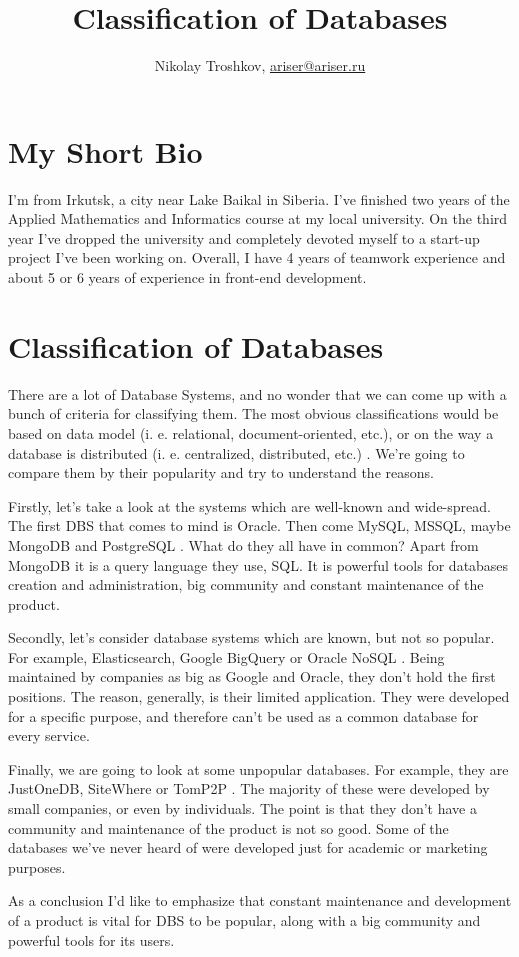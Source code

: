\documentclass{article}
\title{\vspace{-4cm}Classification of Databases}
\author{Nikolay Troshkov, \href{mailto:ariser@ariser.ru}{ariser@ariser.ru}}
\date{}
\begin{document}
\maketitle

\section*{My Short Bio}

I'm from Irkutsk, a city near Lake Baikal in Siberia. I've finished two years of the Applied Mathematics and Informatics course at my local university. On the third year I've dropped the university and completely devoted myself to a start-up project I've been working on. Overall, I have 4 years of teamwork experience and about 5 or 6 years of experience in front-end development.

\section*{Classification of Databases}

There are a lot of Database Systems, and no wonder that we can come up with a bunch of criteria for classifying them. The most obvious classifications would be based on data model (i. e. relational, document-oriented, etc.), or on the way a database is distributed (i. e. centralized, distributed, etc.) \cite{dbClassifications}. We're going to compare them by their popularity and try to understand the reasons.

Firstly, let's take a look at the systems which are well-known and wide-spread. The first DBS that comes to mind is Oracle. Then come MySQL, MSSQL, maybe MongoDB and PostgreSQL \cite{dbTop}. What do they all have in common? Apart from MongoDB it is a query language they use, SQL. It is powerful tools for databases creation and administration, big community and constant maintenance of the product.

Secondly, let's consider database systems which are known, but not so popular. For example, Elasticsearch, Google BigQuery or Oracle NoSQL \cite{dbRanking}. Being maintained by companies as big as Google and Oracle, they don't hold the first positions. The reason, generally, is their limited application. They were developed for a specific purpose, and therefore can't be used as a common database for every service.

Finally, we are going to look at some unpopular databases. For example, they are JustOneDB, SiteWhere or TomP2P \cite{dbRanking}. The majority of these were developed by small companies, or even by individuals. The point is that they don't have a community and maintenance of the product is not so good. Some of the databases we've never heard of were developed just for academic or marketing purposes.

As a conclusion I'd like to emphasize that constant maintenance and development of a product is vital for DBS to be popular, along with a big community and powerful tools for its users.

\printbibliography
\end{document}
